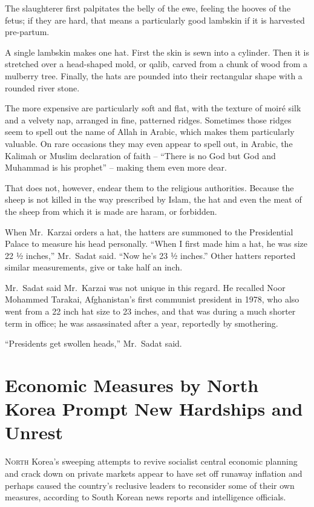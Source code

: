 ﻿\documentclass[12pt]{article}
\begin{document}
The slaughterer first palpitates the belly of the ewe, feeling the hooves of the fetus; if they are
hard, that means a particularly good lambskin if it is harvested pre-partum.

A single lambskin makes one hat. First the skin is sewn into a cylinder. Then it is stretched over a
head-shaped mold, or qalib, carved from a chunk of wood from a mulberry tree. Finally, the hats are
pounded into their rectangular shape with a rounded river stone.

The more expensive are particularly soft and flat, with the texture of moir\'e silk and a velvety
nap, arranged in fine, patterned ridges. Sometimes those ridges seem to spell out the name of Allah
in Arabic, which makes them particularly valuable. On rare occasions they may even appear to spell
out, in Arabic, the Kalimah or Muslim declaration of faith -- ``There is no God but God and Muhammad
is his prophet'' -- making them even more dear.

That does not, however, endear them to the religious authorities. Because the sheep is not killed in
the way prescribed by Islam, the hat and even the meat of the sheep from which it is made are haram,
or forbidden.

When Mr.~Karzai orders a hat, the hatters are summoned to the Presidential Palace to measure his
head personally. ``When I first made him a hat, he was size 22 ½ inches,'' Mr.~Sadat said. ``Now
he's 23 ½ inches.'' Other hatters reported similar measurements, give or take half an inch.

Mr.~Sadat said Mr.~Karzai was not unique in this regard. He recalled Noor Mohammed Tarakai,
Afghanistan's first communist president in 1978, who also went from a 22 inch hat size to 23 inches,
and that was during a much shorter term in office; he was assassinated after a year, reportedly by
smothering.

``Presidents get swollen heads,'' Mr.~Sadat said.

\section{Economic Measures by North Korea Prompt New Hardships and Unrest}

\lettrine{N}{orth} Korea's sweeping attempts to revive socialist central
economic planning and crack down on private markets appear to have set off runaway inflation and
perhaps caused the country's reclusive leaders to reconsider some of their own measures, according
to South Korean news reports and intelligence officials.
\end{document}
